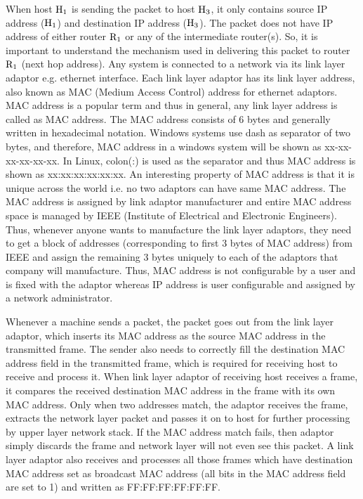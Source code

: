 \begin{multicols}{2}
When host ${\rm H}_{1}$ is sending the packet to host ${\rm H}_{3}$, it only contains source IP address (${\rm H}_{1}$) and destination IP address (${\rm H}_{3}$). The packet does not have IP address of either router ${\rm R}_{1}$ or any of the intermediate router(s). So, it is important to understand the mechanism used in delivering this packet to router ${\rm R}_{1}$ (next hop address). Any system is connected to a network via its link layer adaptor e.g. ethernet interface. Each link layer adaptor has its link layer address, also known as MAC (Medium Access Control) address for ethernet adaptors. MAC address is a popular term and thus in general, any link layer address is called as MAC address. The MAC address consists of 6 bytes and generally written in hexadecimal notation. Windows systems use dash as separator of two bytes, and therefore, MAC address in a windows system will be shown as xx-xx-xx-xx-xx-xx. In Linux, colon(:) is used as the separator and thus MAC address is shown as xx:xx:xx:xx:xx:xx.  An interesting property of MAC address is that it is unique across the world i.e. no two adaptors can have same MAC address. The MAC address is assigned by link adaptor manufacturer and entire MAC address space is managed by IEEE (Institute of Electrical and Electronic Engineers). Thus, whenever anyone wants to manufacture the link layer adaptors, they need to get a block of addresses (corresponding to first 3 bytes of MAC address) from IEEE and assign the remaining 3 bytes uniquely to each of the adaptors that company will manufacture. Thus, MAC address is not configurable by a user and is fixed with the adaptor whereas IP address is user configurable and assigned by a network administrator.

Whenever a machine sends a packet, the packet goes out from the link layer adaptor, which inserts its MAC address as the source MAC address in the transmitted frame. The sender also needs to correctly fill the destination MAC address field in the transmitted frame, which is required for receiving host to receive and process it.  When link layer adaptor of receiving host receives a frame, it compares the received destination MAC address in the frame with its own MAC address. Only when two addresses match, the adaptor receives the frame, extracts the network layer packet and passes it on to host for further processing by upper layer network stack. If the MAC address match fails, then adaptor simply discards the frame and network layer will not even see this packet. A link layer adaptor also receives and processes all those frames which have destination MAC address set as broadcast MAC address (all bits in the MAC address field are set to 1) and written as FF:FF:FF:FF:FF:FF.


\end{multicols}
